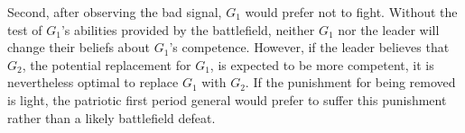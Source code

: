 \documentclass[11pt,]{article}
\begin{document}
Second, after observing the bad signal, $G_1$ would prefer not to fight.  Without the test of $G_1$'s abilities provided by the battlefield, neither $G_1$ nor the leader will change their beliefs about $G_1$'s competence.  However, if the leader believes that $G_2$, the potential replacement for $G_1$, is expected to be more competent, it is nevertheless optimal to replace $G_1$ with $G_2$.  If the punishment for being removed is light, the patriotic first period general would prefer to suffer this punishment rather than a likely battlefield defeat.  



\end{document}
